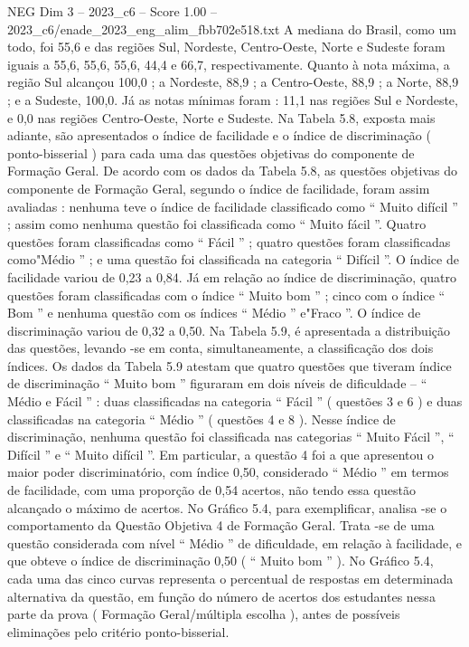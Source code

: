 \begin{textsample}{NEG Dim 3 – 2023\_c6 – Score 1.00 – 2023\_c6/enade\_2023\_eng\_alim\_fbb702e518.txt}
A mediana do Brasil, como um todo, foi 55,6 e das regiões Sul, Nordeste, Centro-Oeste, Norte e Sudeste foram iguais a 55,6, 55,6, 55,6, 44,4 e 66,7, respectivamente.
Quanto à nota máxima, a região Sul alcançou 100,0 ; a Nordeste, 88,9 ; a Centro-Oeste, 88,9 ; a Norte, 88,9 ; e a Sudeste, 100,0.
Já as notas mínimas foram : 11,1 nas regiões Sul e Nordeste, e 0,0 nas regiões Centro-Oeste, Norte e Sudeste.
Na Tabela 5.8, exposta mais adiante, são apresentados o índice de facilidade e o índice de discriminação ( ponto-bisserial ) para cada uma das questões objetivas do componente de Formação Geral.
De acordo com os dados da Tabela 5.8, as questões objetivas do componente de Formação Geral, segundo o índice de facilidade, foram assim avaliadas : nenhuma teve o índice de facilidade classificado como “ Muito difícil ” ; assim como nenhuma questão foi classificada como “ Muito fácil ”.
Quatro questões foram classificadas como “ Fácil ” ; quatro questões foram classificadas como"Médio ” ; e uma questão foi classificada na categoria “ Difícil ”.
O índice de facilidade variou de 0,23 a 0,84.
Já em relação ao índice de discriminação, quatro questões foram classificadas com o índice “ Muito bom ” ; cinco com o índice “ Bom ” e nenhuma questão com os índices “ Médio ” e"Fraco ”.
O índice de discriminação variou de 0,32 a 0,50.
Na Tabela 5.9, é apresentada a distribuição das questões, levando -se em conta, simultaneamente, a classificação dos dois índices.
Os dados da Tabela 5.9 atestam que quatro questões que tiveram índice de discriminação “ Muito bom ” figuraram em dois níveis de dificuldade – “ Médio e Fácil ” : duas classificadas na categoria “ Fácil ” ( questões 3 e 6 ) e duas classificadas na categoria “ Médio ” ( questões 4 e 8 ).
Nesse índice de discriminação, nenhuma questão foi classificada nas categorias “ Muito Fácil ”, “ Difícil ” e “ Muito difícil ”.
Em particular, a questão 4 foi a que apresentou o maior poder discriminatório, com índice 0,50, considerado “ Médio ” em termos de facilidade, com uma proporção de 0,54 acertos, não tendo essa questão alcançado o máximo de acertos.
No Gráfico 5.4, para exemplificar, analisa -se o comportamento da Questão Objetiva 4 de Formação Geral.
Trata -se de uma questão considerada com nível “ Médio ” de dificuldade, em relação à facilidade, e que obteve o índice de discriminação 0,50 ( “ Muito bom ” ).
No Gráfico 5.4, cada uma das cinco curvas representa o percentual de respostas em determinada alternativa da questão, em função do número de acertos dos estudantes nessa parte da prova ( Formação Geral/múltipla escolha ), antes de possíveis eliminações pelo critério ponto-bisserial.

\end{textsample}

